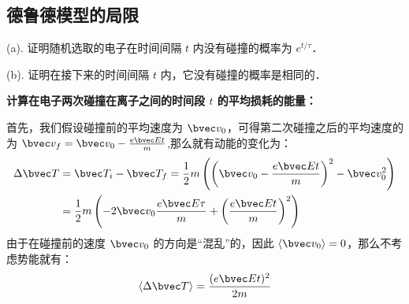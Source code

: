 \subsection{德鲁德模型的局限}

\begin{example}{}
(a). 证明随机选取的电子在时间间隔 $t$ 内没有碰撞的概率为 $e^{t/\tau}$．

(b). 证明在接下来的时间间隔 $t$ 内，它没有碰撞的概率是相同的．
\end{example}
\begin{example}{}
\textbf{计算在电子两次碰撞在离子之间的时间段 $t$ 的平均损耗的能量：}

首先，我们假设碰撞前的平均速度为 $\bvec v_0$，可得第二次碰撞之后的平均速度的为 $\bvec v_f=\bvec v_0 -\frac{e\bvec E t}{m}$,那么就有动能的变化为：
\begin{align}
\Delta \bvec T &= \bvec T_i-\bvec T_f=\frac{1}{2}m\left(\left(\bvec v_0 -\frac{e\bvec E t}{m}\right)^2-\bvec v_0^2\right)\\
&=\frac{1}{2}m\left(-2\bvec v_0\frac{e\bvec E \tau}{m}+\left(\frac{e\bvec E t}{m}\right)^2\right)\\
\end{align}
由于在碰撞前的速度 $\bvec v_0$ 的方向是“混乱”的，因此 $\langle \bvec v_0\rangle = 0$，那么不考虑势能就有：
\begin{equation}
\langle \Delta \bvec T \rangle = \frac{(e\bvec E t)^2}{2m}
\end{equation}
\end{example}
